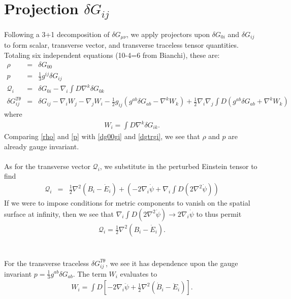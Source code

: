 \documentclass[10pt,letterpaper]{article}
\numberwithin{equation}{section}
\begin{document}
\section{Projection $\delta G_{ij}$}
%
%
Following a 3+1 decomposition of $\delta G_{\mu\nu}$, we apply projectors upon $\delta G_{0i}$ and $\delta G_{ij}$ to form scalar, transverse vector, and transverse traceless tensor quantities. Totaling six independent equations (10-4=6 from Bianchi), these are:
\begin{eqnarray}
\rho &=& \delta G_{00}
\label{rho}\\
p &=& \tfrac13g^{ij} \delta G_{ij}
\label{p}\\
\mathcal Q_i &=& \delta G_{0i}-\nabla_i \int D \nabla^k \delta G_{0k}
\label{Qi}\\
\delta G_{ij}^{T\theta} &=& \delta G_{ij} - \nabla_i W_j - \nabla_j W_i - \frac12 g_{ij}(g^{ab}\delta G_{ab}-\nabla^k W_k) + \frac12 \nabla_i \nabla_j \int D(g^{ab}\delta G_{ab}+\nabla^k W_k)
\label{dgtt}
\end{eqnarray}
where 
\begin{eqnarray}
W_i = \int D \nabla^k \delta G_{ik}.
\end{eqnarray}
Comparing \eqref{rho} and \eqref{p} with \eqref{dg00gi} and \eqref{dgtrgi}, we see that $\rho$ and $p$ are already gauge invariant. 
\\ \\
As for the transverse vector $\mathcal Q_i$, we substitute in the perturbed Einstein tensor to find
\begin{eqnarray}
\mathcal Q_i&=& \tfrac12 \nabla^2 (B_i-\dot E_i) +\left( -2\nabla_i \dot\psi  +\nabla_i \int D (2\nabla^2 \dot \psi)\right)
\end{eqnarray}
If we were to impose conditions for metric components to vanish on the spatial surface at infinity, then we see that $\nabla_i \int D(2\nabla^2\dot\psi)\to 2\nabla_i\dot\psi$ to thus permit 
\begin{eqnarray}
\boxed{\mathcal Q_i = \tfrac12 \nabla^2(B_i-\dot E_i)}.
\end{eqnarray}
\\ \\
For the transverse traceless $\delta G_{ij}^{T\theta}$, we see it has dependence upon the gauge invariant $p = \tfrac13 g^{ab}\delta G_{ab}$. The term $W_i$ evaluates to
\begin{eqnarray}
W_i = \int D [-2\nabla_i \ddot\psi+\tfrac12 \nabla^2(\dot B_i-\ddot E_i)].
\end{eqnarray}
\end{document}
